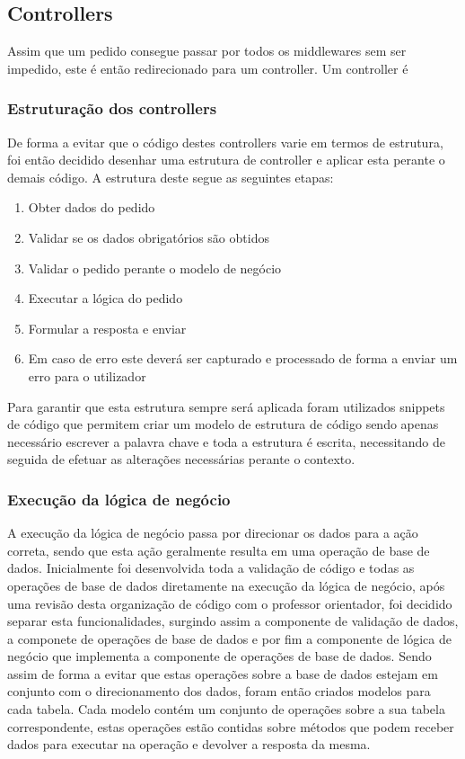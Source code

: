 \subsection{Controllers}
Assim que um pedido consegue passar por todos os middlewares sem ser impedido, este é então redirecionado para um controller.
Um controller é %

\subsubsection{Estruturação dos controllers}
De forma a evitar que o código destes controllers varie em termos de estrutura, foi então decidido desenhar uma estrutura de controller e 
aplicar esta perante o demais código. A estrutura deste segue as seguintes etapas:
\begin{enumerate}
 \item Obter dados do pedido
 \item Validar se os dados obrigatórios são obtidos
 \item Validar o pedido perante o modelo de negócio
 \item Executar a lógica do pedido
 \item Formular a resposta e enviar
 \item Em caso de erro este deverá ser capturado e processado de forma a enviar um erro para o utilizador
\end{enumerate}

Para garantir que esta estrutura sempre será aplicada foram utilizados snippets de código que permitem criar um modelo de estrutura de código sendo apenas necessário escrever a palavra chave e toda a estrutura é escrita, necessitando de seguida de efetuar as alterações necessárias perante 
o contexto.

\newpage

\subsubsection{Execução da lógica de negócio}
A execução da lógica de negócio passa por direcionar os dados para a ação correta, sendo que esta ação geralmente resulta em uma operação de base de dados. Inicialmente foi desenvolvida toda a validação de código e todas as operações de base de dados diretamente na execução da lógica de negócio, após uma revisão desta organização de código com o professor orientador, foi decidido separar esta funcionalidades, surgindo assim a componente de validação de dados, a componete de operações de base de dados e por fim a componente de lógica de negócio que implementa a componente de operações de base de dados. Sendo assim de forma a evitar que estas operações sobre a base de dados estejam em conjunto com o direcionamento dos dados, foram então criados modelos para cada tabela. Cada modelo contém um conjunto de operações sobre a sua tabela correspondente, estas operações estão contidas sobre métodos que podem receber dados para executar na operação e devolver a resposta da mesma.

